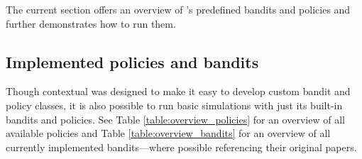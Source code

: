 \documentclass{jss}
\begin{document}
The current section offers an overview of 's predefined bandits and policies and further demonstrates how to run them.

\subsection{Implemented policies and bandits} \label{implbp}

Though contextual was designed to make it easy to develop custom bandit and policy classes, it is also possible to run basic simulations with just its built-in bandits and policies. See Table \ref{table:overview_policies} for an overview of all available policies and Table \ref{table:overview_bandits} for an overview of all currently implemented bandits---where possible referencing their original papers.
\end{document}
